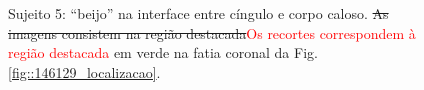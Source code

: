  \begin{figure}[H]
\centering
    \hfill
    \caption{Sujeito 5: ``beijo'' na interface entre cíngulo e corpo caloso. \sout{As imagens consistem na região destacada}\textcolor{red}{Os recortes correspondem à região destacada} em verde na fatia coronal da Fig. \ref{fig::146129_localizacao}.
    }
    \label{fig::146129_kissing}
\end{figure}

